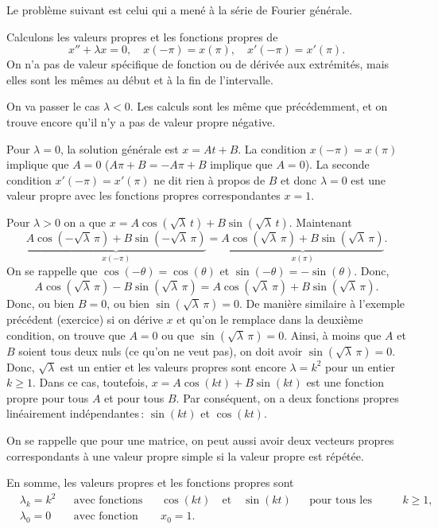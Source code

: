 Le problème suivant est celui qui a mené à la série de Fourier générale.

\begin{example} \label{bvp-periodic:example}
Calculons les valeurs propres et les fonctions propres de 
\begin{equation*}
x'' + \lambda x = 0, \quad x(-\pi) = x(\pi), \quad x'(-\pi) = x'(\pi) .
\end{equation*}
On n'a pas de valeur spécifique de fonction ou de dérivée aux extrémités, mais elles sont les mêmes au début et à la fin de l'intervalle. 

On va passer le cas $\lambda < 0$.  Les calculs sont les même que précédemment, et on trouve encore qu'il n'y a pas de valeur propre négative. 

Pour $\lambda = 0$, la solution générale est $x = At + B$.  La condition
$x(-\pi) = x(\pi)$ implique que $A=0$ ($A\pi + B = -A\pi +B$ implique que $A=0$).
La seconde condition $x'(-\pi) = x'(\pi)$ ne dit rien à propos de  $B$ et donc
$\lambda=0$ est une valeur propre avec les fonctions propres correspondantes $x=1$.

Pour  $\lambda > 0$ on a que 
$x = A \cos ( \sqrt{\lambda}\, t ) + B \sin ( \sqrt{\lambda}\, t)$.
Maintenant
\begin{equation*}
\underbrace{A \cos (-\sqrt{\lambda}\, \pi) + B \sin (-\sqrt{\lambda}\,
\pi)}_{x(-\pi)}
=
\underbrace{A \cos (  \sqrt{\lambda}\, \pi ) + B \sin ( \sqrt{\lambda}\,
\pi)}_{x(\pi)} .
\end{equation*}
On se rappelle que $\cos (- \theta) = \cos (\theta)$ et
$\sin (-\theta) = - \sin (\theta)$. Donc,
\begin{equation*}
A \cos (\sqrt{\lambda}\, \pi) - B \sin ( \sqrt{\lambda}\, \pi)
=
A \cos (\sqrt{\lambda}\, \pi) + B \sin ( \sqrt{\lambda}\, \pi).
\end{equation*}
Donc, ou bien $B=0$, ou bien $\sin ( \sqrt{\lambda}\, \pi) = 0$.
De manière similaire à l'exemple précédent (exercice) si on dérive $x$ et qu'on le remplace dans la deuxième condition, on trouve que $A=0$ ou que $\sin ( \sqrt{\lambda}\, \pi) = 0$.
Ainsi, à moins que $A$ et $B$ soient tous deux nuls (ce qu'on ne veut pas), on doit avoir $\sin ( \sqrt{\lambda}\, \pi ) = 0$.  Donc, $\sqrt{\lambda}$
est un entier et les valeurs propres sont encore $\lambda = k^2$ pour un entier
 $k \geq 1$. Dans ce cas, toutefois,  
$x = A \cos (k t) + B \sin (k t)$ est une fonction propre pour tous  $A$ et pour tous $B$.
Par conséquent, on a deux fonctions propres linéairement indépendantes\,: $\sin (kt)$ et $\cos (kt)$.

On se rappelle que pour une matrice, on peut aussi avoir deux vecteurs propres correspondants à une valeur propre simple si la valeur propre est répétée. 

En somme, les valeurs propres et les fonctions propres sont 
\begin{align*}
& \lambda_k = k^2 & & \text{avec fonctions propres} & &
\cos (k t) \quad \text{et}\quad  \sin (k t)
 & & \text{pour tous les entiers } k \geq 1 , \\
& \lambda_0 = 0 & & \text{avec fonction propre} & & x_0 = 1.
\end{align*}
\end{example}

